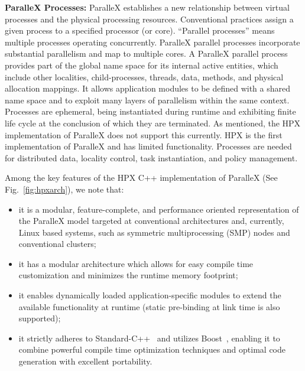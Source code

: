 \documentclass{revtex4}
\newcommand{\B}[1]{\textbf{#1}}
\begin{document}
\B{ParalleX Processes:} ParalleX establishes a new relationship between virtual
processes and the physical processing resources. Conventional practices assign
a given process to a specified processor (or core). ``Parallel processes'' means
multiple processes operating concurrently. ParalleX parallel processes
incorporate substantial parallelism and map to multiple
cores. A ParalleX parallel process provides part of the global name space for its internal
active entities, which include other localities, child-processes, threads, data, methods, and 
physical allocation mappings. It allows
application modules to be defined with a shared name space and to exploit many
layers of parallelism within the same context.
Processes are ephemeral, being instantiated during runtime and
exhibiting finite life cycle at the conclusion of which they are terminated.
As mentioned, the HPX implementation of ParalleX does not support this currently.    
HPX is the first implementation of ParalleX and has limited functionality.  Processes
are needed for distributed data, locality control, task instantiation, and policy 
management.    

Among the key features of the HPX C++ implementation of ParalleX (See Fig.~\ref{fig:hpxarch}), we note that:
\begin{itemize}
\setlength{\itemsep}{0pt}
  \setlength{\parskip}{0pt}
  \setlength{\parsep}{0pt}
  \item it is a modular, feature-complete, and performance oriented representation of the ParalleX model targeted at conventional architectures 
           and, currently, Linux based systems, such as symmetric multiprocessing (SMP) nodes and conventional clusters; 
  \item it has a modular architecture which allows for easy compile time customization and minimizes the runtime memory footprint;  
  \item it enables dynamically loaded application-specific modules to extend the available functionality at runtime (static pre-binding at link time is also supported);
  \item it strictly adheres to Standard-C++~\cite{cpp_standard} and utilizes Boost~\cite{boost}, 
enabling it to combine powerful compile time optimization techniques and optimal code generation with excellent portability.
\end{itemize}
\end{document}
